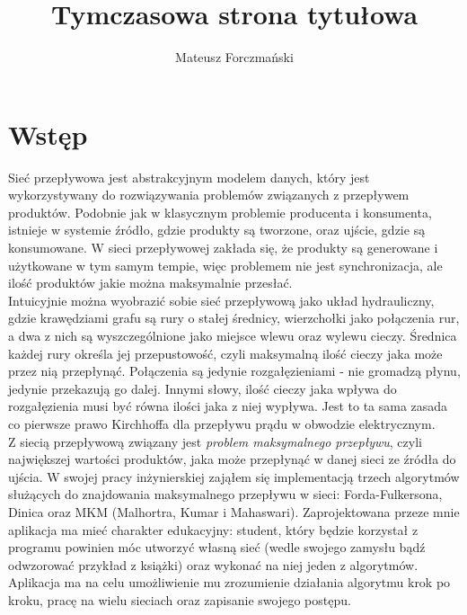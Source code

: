 \documentclass[a4paper]{book}
\title{Tymczasowa strona tytułowa}
\author{Mateusz Forczmański}
\begin{document}

\cleardoublepage

	



\mainmatter

\chapter{Wstęp}
Sieć przepływowa jest abstrakcyjnym modelem danych, który jest wykorzystywany do rozwiązywania problemów związanych z przepływem produktów. Podobnie jak w klasycznym problemie producenta i konsumenta, istnieje w systemie źródło, gdzie produkty są tworzone, oraz ujście, gdzie są konsumowane. W sieci przepływowej zakłada się, że produkty są generowane i użytkowane w tym samym tempie, więc problemem nie jest synchronizacja, ale ilość produktów jakie można maksymalnie przesłać.\\\indent
Intuicyjnie można wyobrazić sobie sieć przepływową jako układ hydrauliczny, gdzie krawędziami grafu są rury o stałej średnicy, wierzchołki jako połączenia rur, a dwa z nich są wyszczególnione jako miejsce wlewu oraz wylewu cieczy. Średnica każdej rury określa jej przepustowość, czyli maksymalną ilość cieczy jaka może przez nią przepłynąć. Połączenia są jedynie rozgałęzieniami - nie gromadzą płynu, jedynie przekazują go dalej. Innymi słowy, ilość cieczy jaka wpływa do rozgałęzienia musi być równa ilości jaka z niej wypływa. Jest to ta sama zasada co pierwsze prawo Kirchhoffa dla przepływu prądu w obwodzie elektrycznym.\\\indent
Z siecią przepływową związany jest \textit{problem maksymalnego przepływu}, czyli największej wartości produktów, jaka może przepłynąć w danej sieci ze źródła do ujścia. W swojej pracy inżynierskiej zająłem się implementacją trzech algorytmów służących do znajdowania maksymalnego przepływu w sieci: Forda-Fulkersona, Dinica oraz MKM (Malhortra, Kumar i Mahaswari). Zaprojektowana przeze mnie aplikacja ma mieć charakter edukacyjny: student, który będzie korzystał z programu powinien móc utworzyć własną sieć (wedle swojego zamysłu bądź odwzorować przykład z książki) oraz wykonać na niej jeden z algorytmów. Aplikacja ma na celu umożliwienie mu zrozumienie działania algorytmu krok po kroku, pracę na wielu sieciach oraz zapisanie swojego postępu.
\end{document}
